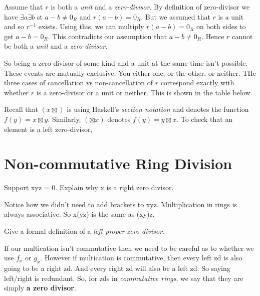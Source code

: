 
Assume that $r$ is both a \textit{unit} and a \textit{zero-divisor}. 
By definition of zero-divisor we have $\exists a \exists b$ st $a-b \neq 0_R$ and $r(a-b) = 0_R$. 
But we assumed that $r$ is a unit and so $r^{-1}$ exists. Using this, we can multiply $r(a-b) = 0_R$ on 
both sides to get $a-b = 0_R$. This contradicts our assumption that $a-b \neq 0_R$. 
Hence $r$ cannot be both a \textit{unit} and a \textit{zero-divisor}.

So being a zero divisor of some kind and a unit at the same time isn't possible. 
These events are mutually exclusive. You either one, or the other, or neither. 
THe three cases of cancellation vs non-cancellation of $r$ correspond exactly with whether 
$r$ is a zero-divisor or a unit or neither. This is shown in the table below.

Recall that $(x \boxtimes)$ is using Haskell's \textit{section notation} and denotes 
the function $f(y) = x \boxtimes y$. Similarly, $(\boxtimes x)$ denotes $f(y) = y \boxtimes x$. To check 
that an element is a left zero-divisor, 






\section{Non-commutative Ring Division}

\begin{example}
Support xyz = 0. Explain why x is a right zero divisor.
\end{example}

Notice how we didn't need to add brackets to xyz. Multiplication in rings is always associative.
So x(yz) is the same as (xy)z. 



\begin{example}
Give a formal definition of a \textit{left proper zero divisor}. 
\end{example}


If our multication isn't commutative then we need to be careful as to whether we use $f_x$ or $g_x$. 
However if multication is commutative, then every left zd is also going to be a right zd.
And every right zd will also be a left zd. So saying left/right is redundant.
So, for zds in \textit{commutative rings}, we say that they are simply \textbf{a zero divisor}.  





